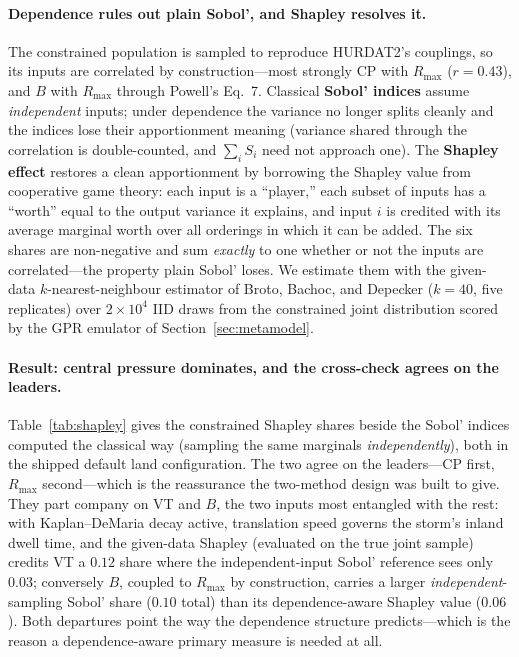 \documentclass[11pt]{article}
\begin{document}
\paragraph{Dependence rules out plain Sobol', and Shapley resolves it.}
The constrained population is sampled to reproduce HURDAT2's couplings, so its inputs
are correlated by construction---most strongly CP with $R_{\max}$ ($r=0.43$), and $B$
with $R_{\max}$ through Powell's Eq.~7. Classical \textbf{Sobol' indices}
\cite{sobol} assume \emph{independent} inputs; under dependence the variance no
longer splits cleanly and the indices lose their apportionment meaning (variance
shared through the correlation is double-counted, and $\sum_i S_i$ need not approach
one). The \textbf{Shapley effect} \cite{owen2014,song2016} restores a clean
apportionment by borrowing the Shapley value from cooperative game theory: each input
is a ``player,'' each subset of inputs has a ``worth'' equal to the output variance it
explains, and input $i$ is credited with its average marginal worth over all orderings
in which it can be added. The six shares are non-negative and sum \emph{exactly} to
one whether or not the inputs are correlated---the property plain Sobol' loses. We
estimate them with the given-data $k$-nearest-neighbour estimator of Broto, Bachoc,
and Depecker \cite{broto2020} ($k=40$, five replicates) over $2\times10^{4}$ IID draws
from the constrained joint distribution scored by the GPR emulator of
Section~\ref{sec:metamodel}.

\paragraph{Result: central pressure dominates, and the cross-check agrees on the leaders.}
Table~\ref{tab:shapley} gives the constrained Shapley shares beside the Sobol' indices
computed the classical way (sampling the same marginals \emph{independently}), both in
the shipped default land configuration. The two agree on the leaders---CP first,
$R_{\max}$ second---which is the reassurance the two-method design was built to give.
They part company on VT and $B$, the two inputs most entangled with the rest: with
Kaplan--DeMaria decay active, translation speed governs the storm's inland dwell time,
and the given-data Shapley (evaluated on the true joint sample) credits VT a $0.12$
share where the independent-input Sobol' reference sees only $0.03$; conversely $B$,
coupled to $R_{\max}$ by construction, carries a larger \emph{independent}-sampling
Sobol' share ($0.10$ total) than its dependence-aware Shapley value ($0.06$). Both
departures point the way the dependence structure predicts---which is the reason a
dependence-aware primary measure is needed at all.
\end{document}
